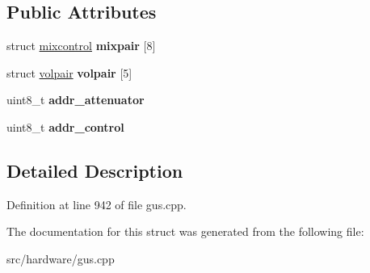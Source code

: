 \subsection*{Public Attributes}
\begin{DoxyCompactItemize}
\item 
\hypertarget{structgus__ICS2101_a7e5b7610442c6f3de38ae67487d9ccfa}{struct \hyperlink{structgus__ICS2101_1_1mixcontrol}{mixcontrol} {\bfseries mixpair} \mbox{[}8\mbox{]}}\label{structgus__ICS2101_a7e5b7610442c6f3de38ae67487d9ccfa}

\item 
\hypertarget{structgus__ICS2101_af99b01cfc9793b759b5c309fd605b563}{struct \hyperlink{structgus__ICS2101_1_1volpair}{volpair} {\bfseries volpair} \mbox{[}5\mbox{]}}\label{structgus__ICS2101_af99b01cfc9793b759b5c309fd605b563}

\item 
\hypertarget{structgus__ICS2101_a259bb6122df1b8689fdf2c5445f23623}{uint8\-\_\-t {\bfseries addr\-\_\-attenuator}}\label{structgus__ICS2101_a259bb6122df1b8689fdf2c5445f23623}

\item 
\hypertarget{structgus__ICS2101_ab1b4294e06737b43bd2fba7eeaee46ee}{uint8\-\_\-t {\bfseries addr\-\_\-control}}\label{structgus__ICS2101_ab1b4294e06737b43bd2fba7eeaee46ee}

\end{DoxyCompactItemize}


\subsection{Detailed Description}


Definition at line 942 of file gus.\-cpp.



The documentation for this struct was generated from the following file\-:\begin{DoxyCompactItemize}
\item 
src/hardware/gus.\-cpp\end{DoxyCompactItemize}
